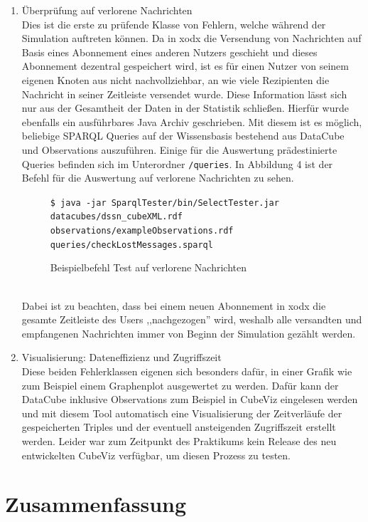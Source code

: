 \documentclass{article}
\begin{document}
\begin{enumerate}
{	}
	\item{Überprüfung auf verlorene Nachrichten\\
	Dies ist die erste zu prüfende Klasse von Fehlern, welche während der Simulation auftreten können. Da in xodx die Versendung von Nachrichten auf Basis eines Abonnement eines anderen Nutzers geschieht und dieses Abonnement dezentral gespeichert wird, ist es für einen Nutzer von seinem eigenen Knoten aus nicht nachvollziehbar, an wie viele Rezipienten die Nachricht in seiner Zeitleiste versendet wurde. Diese Information lässt sich nur aus der Gesamtheit der Daten in der Statistik schließen. Hierfür wurde ebenfalls ein ausführbares Java Archiv geschrieben. Mit diesem ist es möglich, beliebige SPARQL Queries auf der Wissensbasis bestehend aus DataCube und Observations auszuführen. Einige für die Auswertung prädestinierte Queries befinden sich im Unterordner \texttt{/queries}. In Abbildung 4 ist der Befehl für die Auswertung auf verlorene Nachrichten zu sehen.
	\begin{figure}[ht]
	\centering
	\texttt{\$ java -jar SparqlTester/bin/SelectTester.jar datacubes/dssn\_cubeXML.rdf observations/exampleObservations.rdf queries/checkLostMessages.sparql}
	\caption{Beispielbefehl Test auf verlorene Nachrichten}
	\end{figure}\\
	Dabei ist zu beachten, dass bei einem neuen Abonnement in xodx die gesamte Zeitleiste des Users ,,nachgezogen'' wird, weshalb alle versandten und empfangenen Nachrichten immer von Beginn der Simulation gezählt werden.
	}
	\item{Visualisierung: Dateneffizienz und Zugriffszeit\\
	Diese beiden Fehlerklassen eigenen sich besonders dafür, in einer Grafik wie zum Beispiel einem Graphenplot ausgewertet zu werden. Dafür kann der DataCube inklusive Observations zum Beispiel in CubeViz eingelesen werden und mit diesem Tool automatisch eine Visualisierung der Zeitverläufe der gespeicherten Triples und der eventuell ansteigenden Zugriffszeit erstellt werden. Leider war zum Zeitpunkt des Praktikums kein Release des neu entwickelten CubeViz verfügbar, um diesen Prozess zu testen.	
	}
\end{enumerate}

\section{Zusammenfassung}
\end{document}
